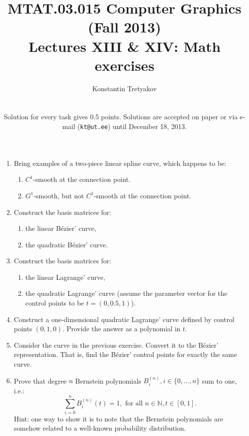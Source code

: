 \documentclass{article}
\newcommand{\Bezier}{B\'{e}zier}
\begin{document}
\title{MTAT.03.015 Computer Graphics (Fall 2013)\\
Lectures XIII \& XIV: Math exercises}
\author{Konstantin Tretyakov\\
\medskip
\\
\parbox{9cm}{\small Solution for every task gives 0.5 points. Solutions are accepted on paper or via e-mail (\texttt{kt@ut.ee}) until December 18, 2013.}
}
\date{}
\maketitle


\begin{enumerate}
\item Bring examples of a two-piece linear spline curve, which happens to be:
\begin{enumerate}
\item $C^1$-smooth at the connection point.
\item $G^1$-smooth, but not $C^1$-smooth at the connection point.
\end{enumerate}

\item Construct the basis matrices for:
\begin{enumerate}
\item the linear \Bezier' curve,
\item the quadratic \Bezier' curve.
\end{enumerate}

\item Construct the basis matrices for:
\begin{enumerate}
\item the linear Lagrange' curve,
\item the quadratic Lagrange' curve (assume the parameter vector for the control points to be $t=(0, 0.5, 1)$).
\end{enumerate}

\item Construct a one-dimensional quadratic Lagrange' curve defined by control points $(0, 1, 0)$. Provide the answer as a polynomial in $t$.

\item Consider the curve in the previous exercise. Convert it to the \Bezier' representation. That is, find the \Bezier' control points for exactly the same curve.

\item Prove that degree $n$ Bernstein polynomials $B_i^{(n)}, i\in\{0,\dots,n\}$ sum to one, i.e.:
$$
\sum_{i=0}^n B_i^{(n)}(t) = 1,\text{   for all   }n\in\mathbb{N}, t\in[0,1].
$$
Hint: one way to show it is to note that the Bernstein polynomials are somehow related to a well-known probability distribution.


\end{enumerate}
\end{document}
